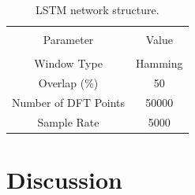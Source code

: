 \begin{table}[h]
	{\setlength{\tabcolsep}{12pt}
		\caption{LSTM network structure.}
		\begin{center}
			\vspace{-6mm}
			\begin{tabular}{cc}
				\hline \\[-2.45ex] \hline \\[-2.1ex]
				Parameter & Value  \\
				\hline \\[-1.8ex]
				Window Type & Hamming    \\
				Overlap (\%) & 50 \\
				Number of DFT Points & 50000  \\
				Sample Rate & 5000    \\
				\hline
			\end{tabular}
			\vspace{-6mm}
		\end{center}
		\label{lstm}}
\end{table}

\section{Discussion}